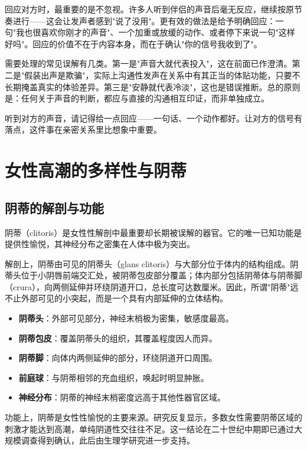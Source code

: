\documentclass[12pt,UTF8]{ctexbook}
\newcommand{\keyword}[1]{\textbf{#1}}
\begin{document}
回应对方时，最重要的是不忽视。许多人听到伴侣的声音后毫无反应，继续按原节奏进行——这会让发声者感到"说了没用"。更有效的做法是给予明确回应：一句"我也很喜欢你刚才的声音"、一个加重或放缓的动作、或者停下来说一句"这样好吗"。回应的价值不在于内容本身，而在于确认"你的信号我收到了"。

需要处理的常见误解有几类。第一是"声音大就代表投入"，这在前面已作澄清。第二是"假装出声是欺骗"，实际上沟通性发声在关系中有其正当的体贴功能，只要不长期掩盖真实的体验差异。第三是"安静就代表冷淡"，这也是错误推断。总的原则是：任何关于声音的判断，都应与直接的沟通相互印证，而非单独成立。

\begin{tcolorbox}[colback=pink!5!white,colframe=red!50!black,title=贴心小叮咛]
听到对方的声音，请记得给一点回应——一句话、一个动作都好。让对方的信号有落点，这件事在亲密关系里比想象中重要。
\end{tcolorbox}

\section{女性高潮的多样性与阴蒂}
\subsection{阴蒂的解剖与功能}

阴蒂（clitoris）是女性性解剖中最重要却长期被误解的器官。它的唯一已知功能是提供性愉悦，其神经分布之密集在人体中极为突出。

解剖上，阴蒂由可见的阴蒂头（glans clitoris）与大部分位于体内的结构组成。阴蒂头位于小阴唇前端交汇处，被阴蒂包皮部分覆盖；体内部分包括阴蒂体与阴蒂脚（crura），向两侧延伸并环绕阴道开口，总长度可达数厘米。因此，所谓"阴蒂"远不止外部可见的小突起，而是一个具有内部延伸的立体结构。

\begin{itemize}
  \item \keyword{阴蒂头}：外部可见部分，神经末梢极为密集，敏感度最高。
  \item \keyword{阴蒂包皮}：覆盖阴蒂头的组织，其覆盖程度因人而异。
  \item \keyword{阴蒂脚}：向体内两侧延伸的部分，环绕阴道开口周围。
  \item \keyword{前庭球}：与阴蒂相邻的充血组织，唤起时明显肿胀。
  \item \keyword{神经分布}：阴蒂的神经末梢密度远高于其他性器官区域。
\end{itemize}

功能上，阴蒂是女性性愉悦的主要来源。研究反复显示，多数女性需要阴蒂区域的刺激才能达到高潮，单纯阴道性交往往不足。这一结论在二十世纪中期即已通过大规模调查得到确认，此后由生理学研究进一步支持。
\end{document}
